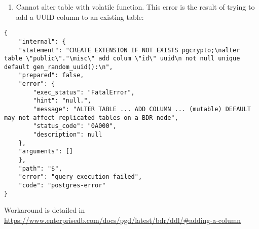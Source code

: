 \documentclass[11pt]{article}
\begin{document}
\begin{enumerate}
\item Cannot alter table with volatile function.  This error is the result of trying to add a UUID column to an existing table:
\end{enumerate}

\begin{verbatim}
{
    "internal": {
	"statement": "CREATE EXTENSION IF NOT EXISTS pgcrypto;\nalter table \"public\"."\misc\" add colum \"id\" uuid\n not null unique default gen_random_uuid():\n",
	"prepared": false,
	"error": {
	    "exec_status": "FatalError",
	    "hint": "null.",
	    "message": "ALTER TABLE ... ADD COLUMN ... (mutable) DEFAULT may not affect replicated tables on a BDR node",
	    "status_code": "0A000",
	    "description": null
	},
	"arguments": []
    },
    "path": "$",
    "error": "query execution failed",
    "code": "postgres-error"
}
\end{verbatim}

Workaround is detailed in \url{https://www.enterprisedb.com/docs/pgd/latest/bdr/ddl/\#adding-a-column}
\end{document}
